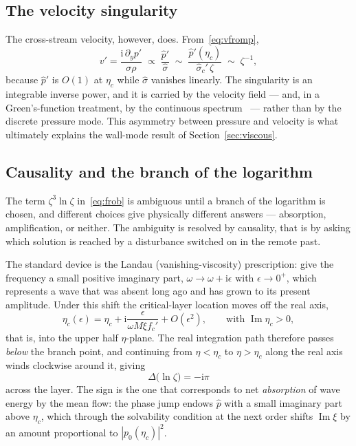 \documentclass[11pt,a4paper]{article}
\newcommand{\ii}{\mathrm{i}}
\newcommand{\sig}{\hat\sigma}
\theoremstyle{plain}
\theoremstyle{remark}
\begin{document}
\subsection{The velocity singularity}
The cross-stream velocity, however, does. From~\eqref{eq:vfromp},
\begin{equation}
v'=\frac{\ii\,\partial_yp'}{\sigma\rho}
\;\propto\;\frac{\hat p'}{\sig}\;\sim\;\frac{\hat p'(\eta_c)}{\sig_c'\,\zeta}\;\sim\;\zeta^{-1},
\label{eq:vsing}
\end{equation}
because $\hat p'$ is $O(1)$ at $\eta_c$ while $\sig$ vanishes linearly. The singularity is an
integrable inverse power, and it is carried by the velocity field --- and, in a Green's-function
treatment, by the continuous spectrum~\cite{case,brambleydarau} --- rather than by the discrete pressure
mode. This asymmetry between pressure and velocity is what ultimately explains the wall-mode result of
Section~\ref{sec:viscous}.

\subsection{Causality and the branch of the logarithm}
The term $\zeta^3\ln\zeta$ in~\eqref{eq:frob} is ambiguous until a branch of the logarithm is chosen,
and different choices give physically different answers --- absorption, amplification, or neither. The
ambiguity is resolved by causality, that is by asking which solution is reached by a disturbance
switched on in the remote past.

The standard device is the Landau (vanishing-viscosity) prescription: give the frequency a small
positive imaginary part, $\omega\to\omega+\ii\epsilon$ with $\epsilon\to0^+$, which represents a wave
that was absent long ago and has grown to its present amplitude. Under this shift the critical-layer
location moves off the real axis,
\begin{equation}
\eta_c(\epsilon)=\eta_c+\ii\frac{\epsilon}{\omega M\xi f_c'}+O(\epsilon^2),
\qquad\text{with }\operatorname{Im}\eta_c>0,
\end{equation}
that is, into the upper half $\eta$-plane. The real integration path therefore passes \emph{below} the
branch point, and continuing from $\eta<\eta_c$ to $\eta>\eta_c$ along the real axis winds clockwise
around it, giving
\begin{equation}
\boxed{\;\Delta\bigl(\ln\zeta\bigr)=-\ii\pi\;}
\label{eq:phasejump}
\end{equation}
across the layer. The sign is the one that corresponds to net \emph{absorption} of wave energy by the
mean flow: the phase jump endows $\hat p$ with a small imaginary part above $\eta_c$, which through the
solvability condition at the next order shifts $\operatorname{Im}\xi$ by an amount proportional to
$|p_0(\eta_c)|^2$.
\end{document}
